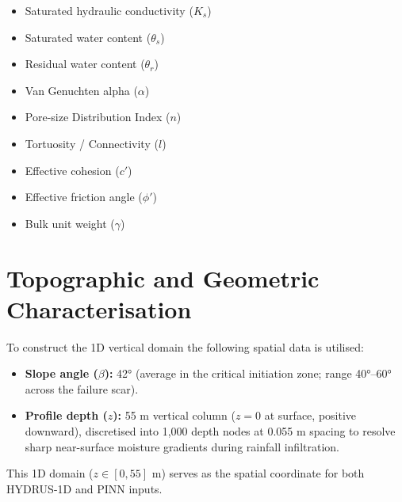\documentclass[12pt]{report}
\begin{document}
\begin{itemize}
    \item Saturated hydraulic conductivity ($K_s$)
    \item Saturated water content ($\theta_s$)
    \item Residual water content ($\theta_r$)
    \item Van Genuchten alpha ($\alpha$)
    \item Pore-size Distribution Index ($n$)
    \item Tortuosity / Connectivity ($l$)
    \item Effective cohesion ($c'$)
    \item Effective friction angle ($\phi'$)
    \item Bulk unit weight ($\gamma$)
\end{itemize}
\newline
{}

\section{Topographic and Geometric Characterisation}

To construct the 1D vertical domain the following spatial data is
utilised:

\begin{itemize}
    \item \textbf{Slope angle ($\beta$):} 42° (average in the critical
    initiation zone; range 40°--60° across the failure scar).

    \item \textbf{Profile depth ($z$):} 55 m vertical column
    ($z = 0$ at surface, positive downward), discretised into 1,000
    depth nodes at 0.055 m spacing to resolve sharp near-surface
    moisture gradients during rainfall infiltration.
\end{itemize}

This 1D domain ($z \in [0, 55]$ m) serves as the spatial coordinate
for both HYDRUS-1D and PINN inputs.
\end{document}
